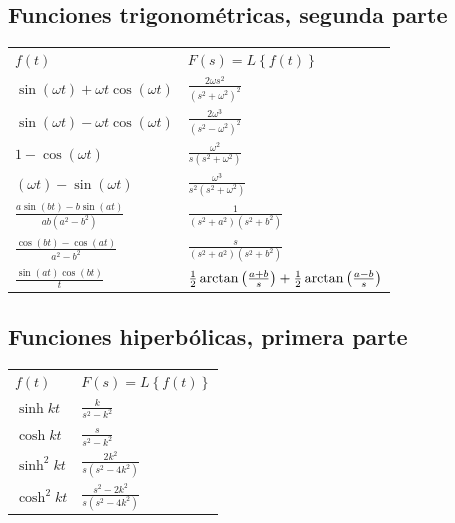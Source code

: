 \subsection{Funciones trigonom\'{e}tricas, segunda parte} 

\begin{center}
\begin{tabular}{ll}
$f\left( t\right)$ & $F\left( s\right) =L\left\{f(t)\right\}$ \\ 
$\sin \left( \omega t\right) +\omega t\cos \left( \omega t\right) $ & $%
\frac{2\omega s^{2}}{\left( s^{2}+\omega ^{2}\right) ^{2}}$ \\ 
$\sin \left( \omega t\right) -\omega t\cos \left( \omega t\right) $ & $%
\frac{2\omega ^{3}}{\left( s^{2}-\omega ^{2}\right) ^{2}}$ \\ 
$1-\cos \left( \omega t\right) $ & $\frac{\omega ^{2}}{s\left( s^{2}+\omega
^{2}\right) }$ \\ 
$\left( \omega t\right) -\sin \left( \omega t\right) $ & $\frac{\omega ^{3}%
}{s^{2}\left( s^{2}+\omega ^{2}\right) }$ \\ 
$\frac{a\sin \left( bt\right) -b\sin \left( at\right) }{ab\left(
a^{2}-b^{2}\right) } $ & $\frac{1}{\left( s^{2}+a^{2}\right) \left(
s^{2}+b^{2}\right) }$ \\ 
$\frac{\cos \left( bt\right) -\cos \left( at\right) }{a^{2}-b^{2}}$ & $%
\frac{s}{\left( s^{2}+a^{2}\right) \left( s^{2}+b^{2}\right) }$ \\ 
$\frac{\sin \left( at\right) \cos \left( bt\right) }{t}$ & $\frac{1}{2}%
\arctan \left( \frac{a+b}{s}\right) +\frac{1}{2}\arctan \left( \frac{a-b}{%
s}\right) $ \\ 
\end{tabular}

\end{center}

\subsection{Funciones hiperb\'{o}licas, primera parte}

\begin{center}
\begin{tabular}{ll}
$f\left( t\right)$ & $F\left( s\right) =L\left\{f(t)\right\}$ \\ 
$\sinh kt$ & $\frac{k}{s^{2}-k^{2}} $ \\ 
$\cosh kt$ & $\frac{s}{s^{2}-k^{2}} $ \\ 
$\sinh ^{2}kt$ & $\frac{2k^{2}}{s\left( s^{2}-4k^{2}\right) } $ \\ 
$\cosh ^{2}kt $ & $\frac{s^{2}-2k^{2}}{s\left( s^{2}-4k^{2}\right) }$%
\end{tabular}
\end{center}


